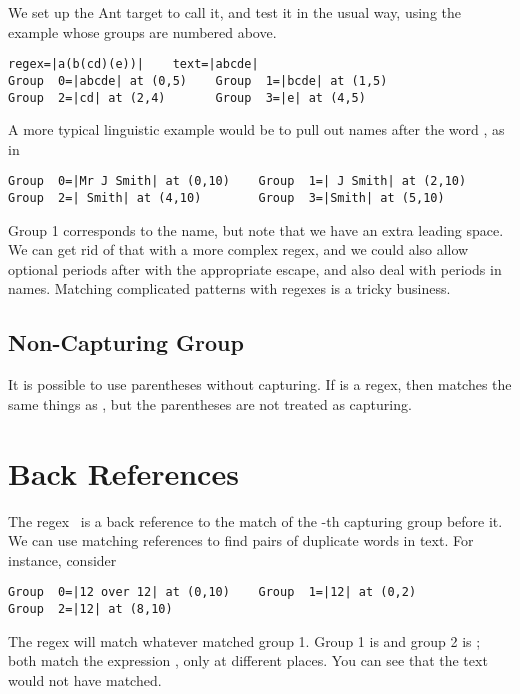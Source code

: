 We set up the Ant target  to call it, and test
it in the usual way, using the example whose groups are numbered
above.
%
\begin{verbatim}
regex=|a(b(cd)(e))|    text=|abcde|
Group  0=|abcde| at (0,5)    Group  1=|bcde| at (1,5)
Group  2=|cd| at (2,4)       Group  3=|e| at (4,5)
\end{verbatim}
%
A more typical linguistic example would be to pull out names
after the word , as in
%
\begin{verbatim}
Group  0=|Mr J Smith| at (0,10)    Group  1=| J Smith| at (2,10)
Group  2=| Smith| at (4,10)        Group  3=|Smith| at (5,10)
\end{verbatim}
%
Group 1 corresponds to the name, but note that we have an extra
leading space.  We can get rid of that with a more complex regex, and
we could also allow optional periods after  with the
appropriate escape, and also deal with periods in names.  Matching
complicated patterns with regexes is a tricky business.

\subsection{Non-Capturing Group}

It is possible to use parentheses without capturing.  If 
is a regex, then  matches the same things as
, but the parentheses are not treated as capturing.


\section{Back References}\label{section:regex-back-references}

The regex \, is a back reference to the match of
the -th capturing group before it.  We can use matching
references to find pairs of duplicate words in text.  For instance,
consider
%
\begin{verbatim}
Group  0=|12 over 12| at (0,10)    Group  1=|12| at (0,2)
Group  2=|12| at (8,10)
\end{verbatim}
%
The regex  will match whatever matched group 1.  
Group 1 is  and group 2 is ; both
match the expression , only at different places.
You can see that the text  would not
have matched.  

